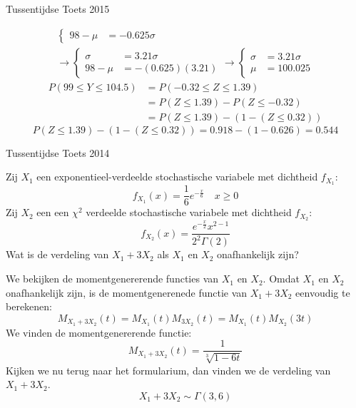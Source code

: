 \documentclass[main.tex]{subfiles}
\begin{document}
\begin{examenvraag}{Tussentijdse Toets 2015}
\begin{ex-antwoord}
\begin{align*}
\begin{cases}
        98-\mu
        &= -0.625\sigma
      \end{cases}\\
      \longrightarrow
      \begin{cases}
        \sigma
        &= 3.21\sigma\\
        98-\mu
        &= -(0.625)(3.21)
      \end{cases}
      \longrightarrow
      \begin{cases}
        \sigma
        &= 3.21\sigma\\
        \mu
        &= 100.025
      \end{cases}
    \end{align*}
    \begin{align*}
      P(99 \le Y \le 104.5)
      &= P(-0.32 \le Z \le 1.39)\\
      &= P(Z \le 1.39) - P(Z \le -0.32)\\
      &= P(Z \le 1.39) - (1-(Z \le 0.32))
    \end{align*}
    \[ P(Z \le 1.39) - (1-(Z \le 0.32)) = 0.918 - (1-0.626) = 0.544\]
  \end{ex-antwoord}
\end{examenvraag}



\begin{examenvraag}{Tussentijdse Toets 2014}
  \begin{ex-vraag}
    Zij $X_{1}$ een exponentieel-verdeelde stochastische variabele met dichtheid $f_{X_{1}}$: 
    \[ f_{X_{1}}(x) = \frac{1}{6}e^{-\frac{x}{6}} \quad x \ge 0 \]
    Zij $X_{2}$ een een $\chi^{2}$ verdeelde stochastische variabele met dichtheid $f_{X_{2}}$: 
    \[ f_{X_{2}}(x) = \frac{e^{-\frac{x}{2}}x^{2-1}}{2^{2}\Gamma(2)} \]
    Wat is de verdeling van $X_{1} + 3X_{2}$ als $X_{1}$ en $X_{2}$ onafhankelijk zijn?
  \end{ex-vraag}

  \begin{ex-antwoord}
    We bekijken de momentgenererende functies van $X_{1}$ en $X_{2}$.
    Omdat $X_{1}$ en $X_{2}$ onafhankelijk zijn, is de momentgenerenede functie van $X_{1} + 3X_{2}$ eenvoudig te berekenen:
    \[ M_{X_{1}+3X_{2}}(t) = M_{X_{1}}(t)M_{3X_{2}}(t) = M_{X_{1}}(t)M_{X_{2}}(3t) \]
    We vinden de momentgenererende functie:
    \[ M_{X_{1}+3X_{2}}(t) = \frac{1}{\sqrt[3]{1-6t}} \]
    Kijken we nu terug naar het formularium, dan vinden we de verdeling van $X_{1} + 3X_{2}$.
    \[ X_{1} + 3X_{2} \sim \Gamma(3,6) \]
  \end{ex-antwoord}
\end{examenvraag}
\end{document}
